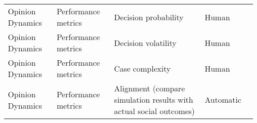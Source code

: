 \begin{small}
\begin{center}
\begin{longtable}{@{}p{}p{}p{}p{}p{}@{}}
Opinion Dynamics         & Performance metrics                 & Decision probability                                                                                                                                                                                        & Human     & \cite{triem2024tipping}                                                                                                                                                                                                                                                                                                                                                         \\
Opinion Dynamics         & Performance metrics                 & Decision volatility                                                                                                                                                                                         & Human     & \cite{triem2024tipping}                                                                                                                                                                                                                                                                                                                                                         \\
Opinion Dynamics         & Performance metrics                 & Case complexity                                                                                                                                                                                             & Human     & \cite{triem2024tipping}                                                                                                                                                                                                                                                                                                                                                         \\
Opinion Dynamics         & Performance metrics                 & Alignment (compare simulation results with actual social outcomes)                                                                                                                                          & Automatic & \cite{Wang2024IntelligentCS}                                                                                                                                                                                                                                                                                                                                                                                                  \\

\end{longtable}
\end{center}
\end{small}
